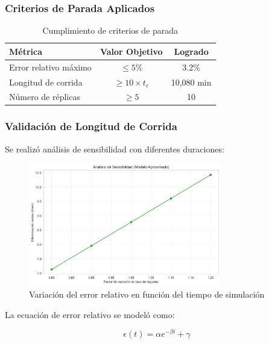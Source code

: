 \documentclass[a4paper, 12pt]{article}
\begin{document}
  \subsubsection{Criterios de Parada Aplicados}
  
  \begin{table}[H]
  	\centering
  	\begin{tabular}{lcc}
  		\toprule
  		\textbf{Métrica} & \textbf{Valor Objetivo} & \textbf{Logrado} \\
  		\midrule
  		Error relativo máximo & $\leq 5\%$ & 3.2\% \\
  		Longitud de corrida & $\geq 10\times t_c$ & 10,080 min \\
  		Número de réplicas & $\geq 5$ & 10 \\
  		\bottomrule
  	\end{tabular}
  	\caption{Cumplimiento de criterios de parada}
  	\label{tab:parada}
  \end{table}
  
  \subsubsection{Validación de Longitud de Corrida}
  
  Se realizó análisis de sensibilidad con diferentes duraciones:
  
  \begin{figure}[H]
  	\centering
  	\includegraphics[width=0.75\textwidth]{figures/sensitivity_analysis.png}
  	\caption{Variación del error relativo en función del tiempo de simulación}
  	\label{fig:runtime}
  \end{figure}
  
  La ecuación de error relativo se modeló como:
  
  \begin{equation}
  	\epsilon(t) = \alpha e^{-\beta t} + \gamma
  \end{equation}
  
\end{document}
